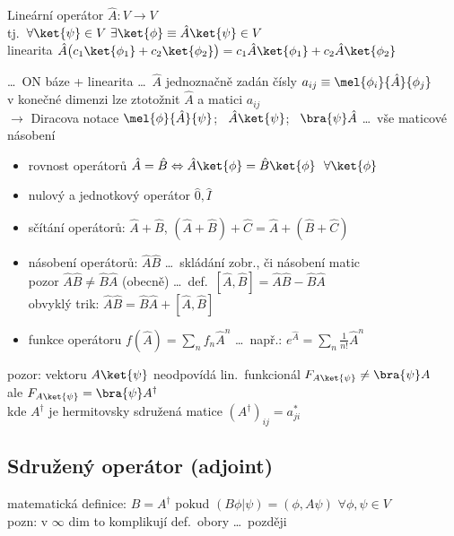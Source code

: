 \documentclass[11pt,a4paper]{article}
\begin{document}
Lineární operátor $\hat A: V \to V$ \\
\quad tj.\ $\forall\ket{\psi}\in V\ \exists\ket{\phi} \equiv \hat A\ket{\psi} \in V$ \quad {} \\
\quad linearita \quad $\hat A\big(c_1\ket{\phi_1} + c_2\ket{\phi_2}\big) = c_1\hat A\ket{\phi_1} + c_2\hat A\ket{\phi_2}$

\dots\ ON báze + linearita \dots\ $\hat A$ jednoznačně zadán čísly $a_{ij} \equiv \mel{\phi_i}{\hat A}{\phi_j}$ \\
\quad v konečné dimenzi lze ztotožnit $\hat A$ a matici $a_{ij}$ \\
$\to$ Diracova notace \quad $\mel{\phi}{\hat A}{\psi}$; \ $\hat A\ket{\psi}$; \ $\bra{\psi}\hat A$ \quad \dots\ vše maticové násobení

\begin{itemize}
  \item rovnost operátorů \quad $\hat A = \hat B \Leftrightarrow \hat A\ket{\phi} = \hat B\ket{\phi}\ \ \forall\ket{\phi}$
  \item nulový a jednotkový operátor $\hat 0, \hat I$ \quad {}
  \item sčítání operátorů: \quad $\hat A + \hat B$, \qquad $(\hat A + \hat B) + \hat C = \hat A + (\hat B + \hat C)$
  \item násobení operátorů: \quad $\hat A\hat B$ \dots\ skládání zobr., či násobení matic \\
        pozor \quad $\hat A\hat B \neq \hat B\hat A$ (obecně) \quad \dots\ def.\ $[\hat A,\hat B] = \hat A\hat B - \hat B\hat A$ \\
        obvyklý trik: \quad $\hat A\hat B = \hat B\hat A + [\hat A,\hat B]$
  \item funkce operátoru \quad $f(\hat A) = \sum_n f_n\hat A^n$ \quad \dots\ např.: $e^{\hat A} = \sum_n \frac{1}{n!}\hat A^n$
\end{itemize}

pozor: vektoru $A\ket{\psi}$ neodpovídá lin.\ funkcionál $F_{A\ket{\psi}} \neq \bra{\psi}A$ \\
\phantom{pozor: vektoru} ale \quad $F_{A\ket{\psi}} = \bra{\psi}A^\dagger$ \\
\quad kde $A^\dagger$ je hermitovsky sdružená matice $(A^\dagger)_{ij} = a_{ji}^*$

\subsection*{Sdružený operátor (adjoint)}
\begin{definice}
matematická definice: \quad $B = A^\dagger$ \quad pokud \quad $(B\phi|\psi) = (\phi, A\psi)$ \quad $\forall\phi,\psi\in V$ \\
pozn: v $\infty$ dim to komplikují def.\ obory \dots\ později
\end{definice}
\end{document}
